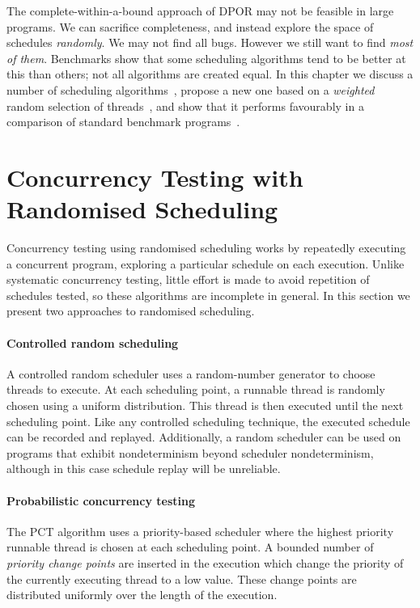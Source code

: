 The complete-within-a-bound approach of DPOR may not be feasible in large
programs.  We can sacrifice completeness, and instead explore the space of
schedules \emph{randomly}.  We may not find all bugs.  However we still want to
find \emph{most of them}.  Benchmarks show that some scheduling algorithms tend
to be better at this than others; not all algorithms are created equal.  In this
chapter we discuss a number of scheduling algorithms~,
propose a new one based on a \emph{weighted} random selection of
threads~, and show that it performs favourably in a
comparison of standard benchmark programs~.

\section{Concurrency Testing with Randomised Scheduling}
\label{sec:algorithms-usual}

Concurrency testing using randomised scheduling works by repeatedly executing a
concurrent program, exploring a particular schedule on each execution.  Unlike
systematic concurrency testing, little effort is made to avoid repetition of
schedules tested, so these algorithms are incomplete in general.  In this
section we present two approaches to randomised scheduling.

\paragraph{Controlled random scheduling}
A controlled random scheduler uses a random-number generator to choose threads
to execute. At each scheduling point, a runnable thread is randomly chosen using
a uniform distribution. This thread is then executed until the next scheduling
point. Like any controlled scheduling technique, the executed schedule can be
recorded and replayed. Additionally, a random scheduler can be used on programs
that exhibit nondeterminism beyond scheduler nondeterminism, although in this
case schedule replay will be unreliable\cite{thomson2016}.

\paragraph{Probabilistic concurrency testing}
The PCT algorithm\cite{burckhardt2010} uses a priority-based scheduler where the
highest priority runnable thread is chosen at each scheduling point. A bounded
number of \emph{priority change points} are inserted in the execution which
change the priority of the currently executing thread to a low value. These
change points are distributed uniformly over the length of the execution.

